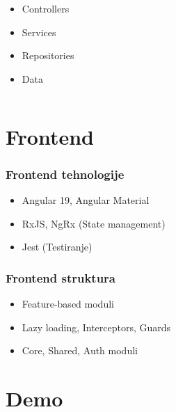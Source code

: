 \documentclass[aspectratio=169]{beamer}
\begin{document}
\begin{frame}
\begin{columns}
\begin{column}{0.6\textwidth}
\begin{itemize}
\begin{itemize}
                    \begin{itemize}
                        \item Controllers
                        \item Services
                        \item Repositories
                        \item Data
                    \end{itemize}
                \end{itemize}
            \end{itemize}
        \end{column}
    \end{columns}
\end{frame}

\section{Frontend}

\begin{frame}
    \frametitle{Frontend tehnologije}
    \begin{itemize}
        \item Angular 19, Angular Material
        \item RxJS, NgRx (State management)
        \item Jest (Testiranje)
    \end{itemize}
\end{frame}

\begin{frame}
    \frametitle{Frontend struktura}
    \begin{itemize}
        \item Feature-based moduli
        \item Lazy loading, Interceptors, Guards
        \item Core, Shared, Auth moduli
    \end{itemize}
\end{frame}

\section{Demo}
\end{document}
